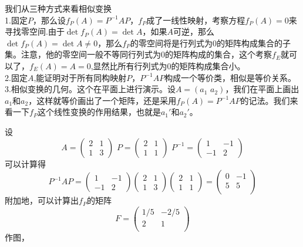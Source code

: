 \documentclass[11pt,a4paper,openany]{book}%
\theoremstyle{plain}%
\begin{document}
我们从三种方式来看相似变换\\
1.固定$P$，那么设$f_P(A)=P^{-1}AP$，$f_P$成了一线性映射，考察方程$f_P(A)=0$来寻找零空间.由于$\det f_P(A)=\det A$，如果$A$可逆，那么$\det f_P(A)=\det A\neq0$，那么$f_P$的零空间将是行列式为0的矩阵构成集合的子集。注意，他的零空间一般不等同行列式为0的矩阵构成的集合，这个考察$f_E$就可以了，$f_E(A)=A=0$,显然比所有行列式为0的矩阵构成集合小。\\
2.固定$A$,能证明对于所有同构映射$P$，$P^{-1}AP$构成一个等价类，相似是等价关系。\\
3.相似变换的几何。这个在平面上进行演示。设$A=(a_1\,\,a_2)$，我们在平面上画出$a_1$和$a_2$，这样就等价画出了一个矩阵，还是采用$f_P(A)=P^{-1}AP$的记法。我们来看一下$f_P$这个线性变换的作用结果，也就是$a_1'$和$a_2'$。

设
\[
A=
\begin{pmatrix}
2&1\\
1&3
\end{pmatrix}
\,\, P=
\begin{pmatrix}
2&1\\
1&1
\end{pmatrix}
\,\, P^{-1}=
\begin{pmatrix}
1&-1\\
-1&2
\end{pmatrix}
\]
可以计算得
\[
P^{-1}AP=
\begin{pmatrix}
1&-1\\
-1&2
\end{pmatrix}
\begin{pmatrix}
2&1\\
1&3
\end{pmatrix}
\begin{pmatrix}
2&1\\
1&1
\end{pmatrix}
=
\begin{pmatrix}
 0 & -1 \\
 5 & 5 \\
\end{pmatrix}
\]
附加地，可以计算出$f_P$的矩阵
\[
F=
\begin{pmatrix}
1/5 & -2/5 \\
 2 & 1 \\
\end{pmatrix}
\]
作图，
\begin{center}
\end{center}
\end{document}
